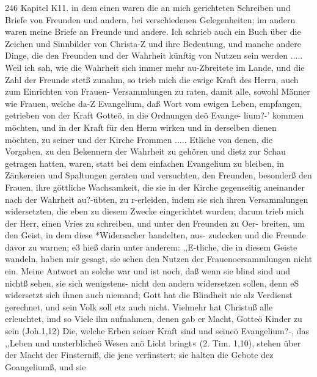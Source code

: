 246 Kapitel K11.
in dem einen waren die an mich gerichteten Schreiben und Briefe
von Freunden und andern, bei verschiedenen Gelegenheiten; im
andern waren meine Briefe an Freunde und andere. Ich schrieb
auch ein Buch über die Zeichen und Sinnbilder von Christa-Z
und ihre Bedeutung, und manche andere Dinge, die den Freunden
und der Wahrheit künftig von Nutzen sein werden .....
Weil ich sah, wie die Wahrheit sich immer mehr au-Zbreitete
im Lande, und die Zahl der Freunde stetß zunahm, so trieb mich
die ewige Kraft des Herrn, auch zum Einrichten von Frauen-
Versammlungen zu raten, damit alle, sowohl Männer wie Frauen,
welche da-Z Evangelium, daß Wort vom ewigen Leben, empfangen,
getrieben von der Kraft Gotteö, in die Ordnungen deö Evange-
lium?-’ kommen möchten, und in der Kraft für den Herm wirken
und in derselben dienen möchten, zu seiner und der Kirche
Frommen .....
Etliche von denen, die Vorgaben, zu den Bekennern der
Wahrheit zu gehören und dietz zur Schau getragen hatten,
waren, statt bei dem einfachen Evangelium zu bleiben, in
Zänkereien und Spaltungen geraten und versuchten, den Freunden,
besonderß den Frauen, ihre göttliche Wachsamkeit, die sie in der
Kirche gegenseitig aneinander nach der Wahrheit au?-übten, zu
r-erleiden, indem sie sich ihren Versammlungen widersetzten, die
eben zu diesem Zwecke eingerichtet wurden; darum trieb mich der
Herr, einen Vries zu schreiben, und unter den Freunden zu Oer-
breiten, um den Geist, in dem diese *Widersacher handelten, aus-
zudecken und die Freunde davor zu warnen; e3 hieß darin
unter anderem:
,,E-tliche, die in diesem Geiste wandeln, haben mir gesagt,
sie sehen den Nutzen der Frauenoersammlungen nicht ein.
Meine Antwort an solche war und ist noch, daß wenn sie blind
sind und nichtß sehen, sie sich wenigstens- nicht den andern
widersetzen sollen, denn eS widersetzt sich ihnen auch niemand;
Gott hat die Blindheit nie alz Verdienst gerechnet, und sein Volk
soll etz auch nicht. Vielmehr hat Christuß alle erleuchtet, imd so
Viele ihn aufnahmen, denen gab er Macht, Gotteö Kinder zu
sein (Joh.1,12) Die, welche Erben seiner Kraft sind und seineö
Evangelium?-, das ,,Leben und unsterblicheö Wesen anö Licht
bringt« (2. Tim. 1,10), stehen über der Macht der Finsterniß, die
jene verfinstert; sie halten die Gebote dez Goangeliumß, und sie


